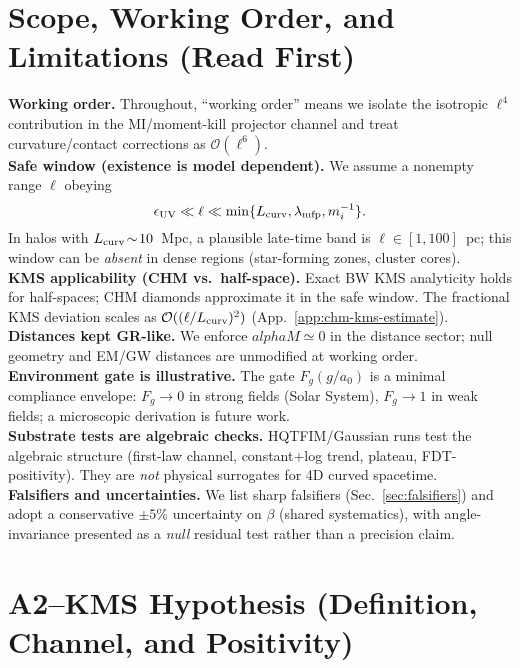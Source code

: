 \documentclass[aps,prd,onecolumn,superscriptaddress,nofootinbib]{revtex4-2}
\def\alphaM{alphaM}%
\def\alpha{alpha}%
\def\alpha_M{alphaM}%
\providecommand{\alphaM}{\alpha_M}
\begin{document}
\section{Scope, Working Order, and Limitations (Read First)}
\label{sec:scope}
\noindent\textbf{Working order.} Throughout, ``working order'' means we isolate the isotropic \(\ell^4\) contribution in the MI/moment-kill projector channel and treat curvature/contact corrections as \(\mathcal O(\ell^6)\).\\[3pt]
\noindent\textbf{Safe window (existence is model dependent).} We assume a nonempty range \(\ell\) obeying
\[
\epsilon_{\rm UV}\ll \ell \ll \min\{L_{\rm curv},\lambda_{\rm mfp},m_i^{-1}\}.
\]
In halos with \(L_{\rm curv}\!\sim\!10\)~Mpc, a plausible late-time band is \(\ell\in[1,100]\)~pc; this window can be \emph{absent} in dense regions (star-forming zones, cluster cores).\\[3pt]
\noindent\textbf{KMS applicability (CHM vs.\ half-space).} Exact BW KMS analyticity holds for half-spaces; CHM diamonds approximate it in the safe window. The fractional KMS deviation scales as \(\mathcal O((\ell/L_{\rm curv})^2)\) (App.~\ref{app:chm-kms-estimate}).\\[3pt]
\noindent\textbf{Distances kept GR-like.} We enforce \(\alphaM\simeq 0\) in the distance sector; null geometry and EM/GW distances are unmodified at working order.\\[3pt]
\noindent\textbf{Environment gate is illustrative.} The gate \(F_g(g/a_0)\) is a minimal compliance envelope: \(F_g\!\to\!0\) in strong fields (Solar System), \(F_g\!\to\!1\) in weak fields; a microscopic derivation is future work.\\[3pt]
\noindent\textbf{Substrate tests are algebraic checks.} HQTFIM/Gaussian runs test the algebraic structure (first-law channel, constant+log trend, plateau, FDT-positivity). They are \emph{not} physical surrogates for 4D curved spacetime.\\[3pt]
\noindent\textbf{Falsifiers and uncertainties.} We list sharp falsifiers (Sec.~\ref{sec:falsifiers}) and adopt a conservative \(\pm 5\%\) uncertainty on \(\beta\) (shared systematics), with angle-invariance presented as a \emph{null} residual test rather than a precision claim.

\section{A2--KMS Hypothesis (Definition, Channel, and Positivity)}
\label{sec:A2KMS}
\end{document}

